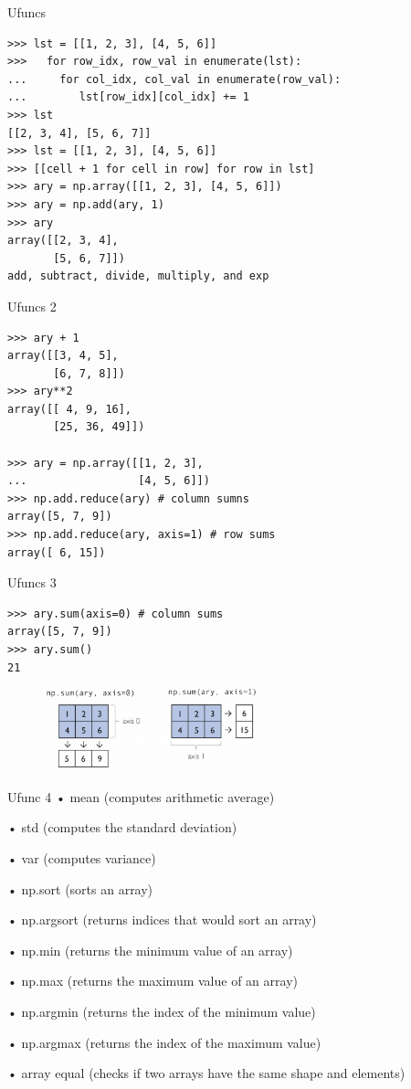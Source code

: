 \documentclass{beamer}
\begin{document}
\begin{frame}[fragile]{Ufuncs}
\begin{verbatim}
>>> lst = [[1, 2, 3], [4, 5, 6]]
>>>   for row_idx, row_val in enumerate(lst):
...     for col_idx, col_val in enumerate(row_val):
...        lst[row_idx][col_idx] += 1
>>> lst
[[2, 3, 4], [5, 6, 7]]
>>> lst = [[1, 2, 3], [4, 5, 6]]
>>> [[cell + 1 for cell in row] for row in lst]
>>> ary = np.array([[1, 2, 3], [4, 5, 6]])
>>> ary = np.add(ary, 1)
>>> ary
array([[2, 3, 4],
       [5, 6, 7]])
add, subtract, divide, multiply, and exp
\end{verbatim}
\end{frame}

\begin{frame}[fragile]{Ufuncs 2}
\begin{verbatim}
>>> ary + 1
array([[3, 4, 5],
       [6, 7, 8]])
>>> ary**2
array([[ 4, 9, 16],
       [25, 36, 49]])
       
>>> ary = np.array([[1, 2, 3],
...                 [4, 5, 6]])
>>> np.add.reduce(ary) # column sumns
array([5, 7, 9])
>>> np.add.reduce(ary, axis=1) # row sums
array([ 6, 15])
\end{verbatim}
\end{frame}

\begin{frame}[fragile]{Ufuncs 3}
\begin{verbatim}
>>> ary.sum(axis=0) # column sums
array([5, 7, 9])
>>> ary.sum()
21
\end{verbatim}
\begin{figure}
    \centering
    \includegraphics[width=0.55\textwidth]{np3.png}
\end{figure}
\end{frame}

\begin{frame}{Ufunc 4}
• mean (computes arithmetic average)

• std (computes the standard deviation)

• var (computes variance)

• np.sort (sorts an array)

• np.argsort (returns indices that would sort an array)

• np.min (returns the minimum value of an array)

• np.max (returns the maximum value of an array)

• np.argmin (returns the index of the minimum value)

• np.argmax (returns the index of the maximum value)

• array equal (checks if two arrays have the same shape and elements)
\end{frame}
\end{document}
